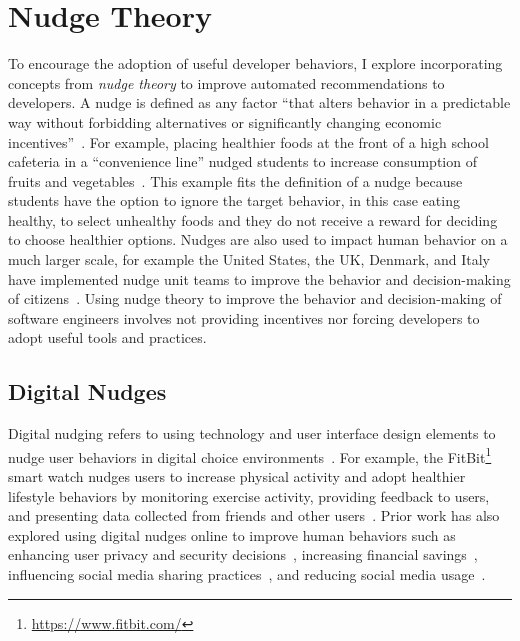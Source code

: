 \section{Nudge Theory}

To encourage the adoption of useful developer behaviors, I explore incorporating concepts from \textit{nudge theory} to improve automated recommendations to developers. A nudge is defined as any factor ``that alters behavior in a predictable way without forbidding alternatives or significantly changing economic incentives''~\citep[p.~6]{nudge}. For example, placing healthier foods at the front of a high school cafeteria in a ``convenience line'' nudged students to increase consumption of fruits and vegetables~\cite{Hanks2012Lunchroom}. This example fits the definition of a nudge because students have the option to ignore the target behavior, in this case eating healthy, to select unhealthy foods and they do not receive a reward for deciding to choose healthier options. Nudges are also used to impact human behavior on a much larger scale, for example the United States, the UK, Denmark, and Italy have implemented nudge unit teams to improve the behavior and decision-making of citizens~\cite{DelBalzoNudging}. Using nudge theory to improve the behavior and decision-making of software engineers involves not providing incentives nor forcing developers to adopt useful tools and practices.

\subsection{Digital Nudges}

Digital nudging refers to using technology and user interface design elements to nudge user behaviors in digital choice environments~\cite{weinmann2016digitalnudging}. For example, the FitBit\footnote{\url{https://www.fitbit.com/}} smart watch nudges users to increase physical activity and adopt healthier lifestyle behaviors by monitoring exercise activity, providing feedback to users, and presenting data collected from friends and other users~\cite{weinmann2016digitalnudging}. Prior work has also explored using digital nudges online to improve human behaviors such as enhancing user privacy and security decisions~\cite{acquisti2017nudges}, increasing financial savings~\cite{madrian2001power}, influencing social media sharing practices~\cite{huang2018digital}, and reducing social media usage~\cite{purohit2020designing}. 

